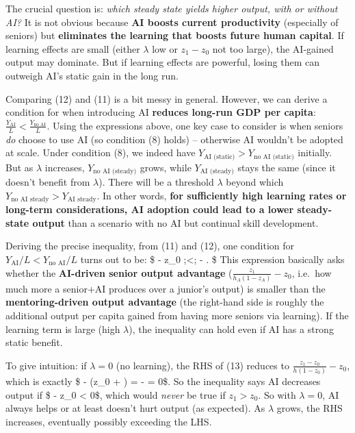 \documentclass[12pt]{article}
\begin{document}
The crucial question is: \emph{which steady state yields higher output,
with or without AI?} It is not obvious because \textbf{AI boosts current
productivity} (especially of seniors) but \textbf{eliminates the
learning that boosts future human capital}. If learning effects are
small (either \(\lambda\) low or \(z_1 - z_0\) not too large), the
AI-gained output may dominate. But if learning effects are powerful,
losing them can outweigh AI's static gain in the long run.

Comparing (12) and (11) is a bit messy in general. However, we can
derive a condition for when introducing AI \textbf{reduces long-run GDP
per capita}: \(\frac{Y_{\text{AI}}}{L} < \frac{Y_{\text{no AI}}}{L}.\)
Using the expressions above, one key case to consider is when seniors
\emph{do} choose to use AI (so condition (8) holds) -- otherwise AI
wouldn't be adopted at scale. Under condition (8), we indeed have
\(Y_{\text{AI (static)}} > Y_{\text{no AI (static)}}\) initially. But as
\(\lambda\) increases, \(Y_{\text{no AI (steady)}}\) grows, while
\(Y_{\text{AI (steady)}}\) stays the same (since it doesn't benefit from
\(\lambda\)). There will be a threshold \(\lambda\) beyond which
\(Y_{\text{no AI steady}} > Y_{\text{AI steady}}\). In other words,
\textbf{for sufficiently high learning rates or long-term
considerations, AI adoption could lead to a lower steady-state output}
than a scenario with no AI but continual skill development.

Deriving the precise inequality, from (11) and (12), one condition for
\(Y_{\text{AI}}/L < Y_{\text{no AI}}/L\) turns out to be: \$
 - z\_0 ;\textless;
 -
. \$ This
expression basically asks whether the \textbf{AI-driven senior output
advantage} (\(\frac{z_1}{h_A(1-z_A)} - z_0\), i.e.~how much more a
senior+AI produces over a junior's output) is smaller than the
\textbf{mentoring-driven output advantage} (the right-hand side is
roughly the additional output per capita gained from having more seniors
via learning). If the learning term is large (high \(\lambda\)), the
inequality can hold even if AI has a strong static benefit.

To give intuition: if \(\lambda = 0\) (no learning), the RHS of (13)
reduces to \(\frac{z_1 - z_0}{h(1-z_0)} - z_0\), which is exactly \$
 - (z\_0 + ) =
 -  = 0\$. So the inequality
says AI decreases output if \$  - z\_0 \textless{}
0\$, which would \emph{never} be true if \(z_1 > z_0\). So with
\(\lambda=0\), AI always helps or at least doesn't hurt output (as
expected). As \(\lambda\) grows, the RHS increases, eventually possibly
exceeding the LHS.
\end{document}
